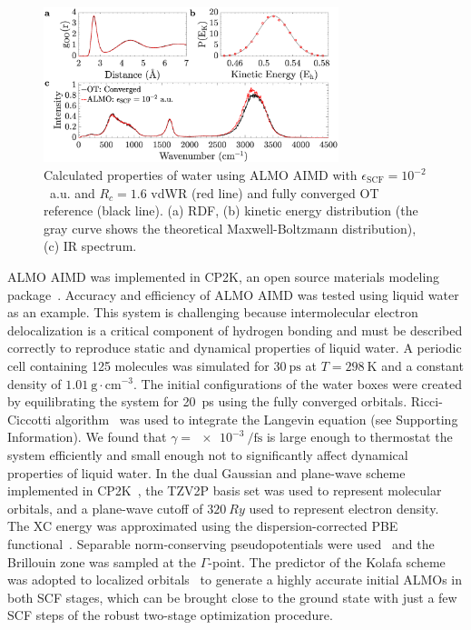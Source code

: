 \documentclass[aip,jcp,reprint,amsmath,amssymb]{revtex4-1}
\begin{document}
\begin{figure}
\includegraphics[trim={1.3cm 0.1cm 3.3cm 1.3cm},clip,width=8.6cm]{1.eps}
\caption{\label{fig:dynproperties} 
Calculated properties of water using ALMO AIMD with $\epsilon_{\text{SCF}} = 10^{-2}$~a.u. and $R_{c} = 1.6$ vdWR (red line) and fully converged OT reference (black line).
(a) RDF, 
(b) kinetic energy distribution (the gray curve shows the theoretical Maxwell-Boltzmann distribution), 
(c) IR spectrum.
}
\end{figure}

ALMO AIMD was implemented in CP2K, an open source materials modeling package~\cite{www:cp2k}. 
Accuracy and efficiency of ALMO AIMD was tested using liquid water as an example. 
This system is challenging because intermolecular electron delocalization is a critical component of hydrogen bonding and must be described correctly to reproduce static and dynamical properties of liquid water. 
A periodic cell containing 125 molecules was simulated for $\SI{30}{\ps}$ at $T=\SI{298}{\K}$ and a constant density of $\SI{1.01}{\g\cdot\cm^{-3}}$. 
The initial configurations of the water boxes were created by equilibrating the system for 20~ps using the fully converged orbitals. 
Ricci-Ciccotti algorithm~\cite{Ricci2003} was used to integrate the Langevin equation (see Supporting Information). We found that $\gamma = \SI{e-3}{\per\fs}$ is large enough to thermostat the system efficiently and small enough not to significantly affect dynamical properties of liquid water.
%
In the dual Gaussian and plane-wave scheme implemented in CP2K~\cite{a:quickstep}, the TZV2P basis set was used to represent molecular orbitals, and a plane-wave cutoff of $\SI{320}{Ry}$ used to represent electron density. 
The XC energy was approximated using the dispersion-corrected PBE functional~\cite{a:pbe,Grimme2010}. 
Separable norm-conserving pseudopotentials were used~\cite{a:hgh} and the Brillouin zone was sampled at the $\Gamma$-point. 
The predictor of the Kolafa scheme~\cite{Kolafa2003} was adopted to localized orbitals~\cite{a:2ndcpmd} to generate a highly accurate initial ALMOs in both SCF stages, which can be brought close to the ground state with just a few SCF steps of the robust two-stage optimization procedure. 
\end{document}
